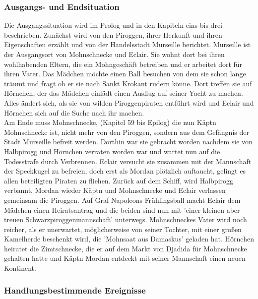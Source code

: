 \subsubsection{Ausgangs- und Endsituation}
Die Ausgangssituation wird im Prolog und in den Kapiteln eins bis drei beschrieben. 
Zunächst wird von den Piroggen, ihrer Herkunft und ihren Eigenschaften erzählt und von der 
Handelsstadt Murseille berichtet. Murseille ist der Ausgangsort von Mohnschnecke und Eclair. 
Sie wohnt dort bei ihren wohlhabenden Eltern, die ein Mohngeschäft betreiben und er arbeitet dort 
für ihren Vater. Das Mädchen möchte einen Ball besuchen von dem sie schon lange träumt und fragt ob 
er sie nach Sankt Krokant rudern könne. Dort treffen sie auf Hörnchen, der das Mädchen einlädt einen 
Ausflug auf seiner Yacht zu machen. Alles ändert sich, als sie von wilden Piroggenpiraten entführt wird 
und Eclair und Hörnchen sich auf die Suche nach ihr machen.
\\
Am Ende muss Mohnschnecke, (Kapitel 59 bis Epilog) die nun Käptn Mohnschnecke ist, nicht mehr von den Piroggen, 
sondern aus dem Gefängnis der Stadt Murseille befreit werden. Dorthin war sie gebracht worden nachdem sie von 
Halbpirogg und Hörnchen verraten worden war und wartet nun auf die Todesstrafe durch Verbrennen. Eclair 
versucht sie zusammen mit der Mannschaft der Speckkugel zu befreien, doch erst als Mordan plötzlich auftaucht, 
gelingt es allen beteiligten Piraten zu fliehen. Zurück auf dem Schiff, wird Halbpirogg verbannt, Mordan wieder 
Käptn und Mohnschnecke und Eclair verlassen gemeinsam die Piroggen. Auf Graf Napoleons Frühlingsball macht Eclair 
dem Mädchen einen Heiratsantrag und die beiden sind nun mit 'einer kleinen aber treuen Schwarzpiroggenmannschaft'
unterwegs. \cite[S.643]{pir} Mohnschneckes Vater wird noch reicher, als er unerwartet, möglicherweise von seiner Tochter, 
mit einer großen Kamelherde beschenkt wird, die 'Mohnsaat aus Damaskus' \cite[S.645]{pir} geladen hat.
Hörnchen heiratet die Zimtschnecke, die er auf dem Markt von Djadida für Mohnschnecke gehalten hatte \cite[S.644]{pir} 
und Käptn Mordan entdeckt mit seiner Mannschaft einen neuen Kontinent.\cite[S.646]{pir} 


\subsubsection{Handlungsbestimmende Ereignisse}

